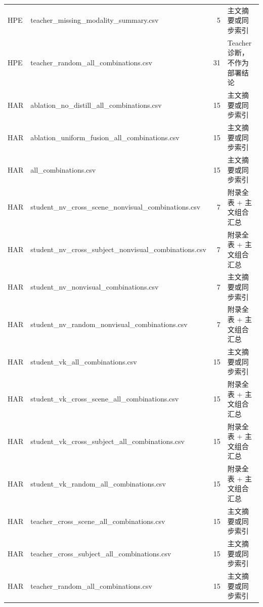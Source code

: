\documentclass[UTF8,10pt]{ctexart}
\begin{document}
{\begin{longtable}{llrl}
HPE & teacher\_missing\_modality\_summary.csv & 5 & 主文摘要或同步索引\\
HPE & teacher\_random\_all\_combinations.csv & 31 & Teacher 诊断，不作为部署结论\\
HAR & ablation\_no\_distill\_all\_combinations.csv & 15 & 主文摘要或同步索引\\
HAR & ablation\_uniform\_fusion\_all\_combinations.csv & 15 & 主文摘要或同步索引\\
HAR & all\_combinations.csv & 15 & 主文摘要或同步索引\\
HAR & student\_nv\_cross\_scene\_nonvisual\_combinations.csv & 7 & 附录全表 + 主文组合汇总\\
HAR & student\_nv\_cross\_subject\_nonvisual\_combinations.csv & 7 & 附录全表 + 主文组合汇总\\
HAR & student\_nv\_nonvisual\_combinations.csv & 7 & 主文摘要或同步索引\\
HAR & student\_nv\_random\_nonvisual\_combinations.csv & 7 & 附录全表 + 主文组合汇总\\
HAR & student\_vk\_all\_combinations.csv & 15 & 主文摘要或同步索引\\
HAR & student\_vk\_cross\_scene\_all\_combinations.csv & 15 & 附录全表 + 主文组合汇总\\
HAR & student\_vk\_cross\_subject\_all\_combinations.csv & 15 & 附录全表 + 主文组合汇总\\
HAR & student\_vk\_random\_all\_combinations.csv & 15 & 附录全表 + 主文组合汇总\\
HAR & teacher\_cross\_scene\_all\_combinations.csv & 15 & 主文摘要或同步索引\\
HAR & teacher\_cross\_subject\_all\_combinations.csv & 15 & 主文摘要或同步索引\\
HAR & teacher\_random\_all\_combinations.csv & 15 & 主文摘要或同步索引\\
\bottomrule
\end{longtable}
}
\end{document}
